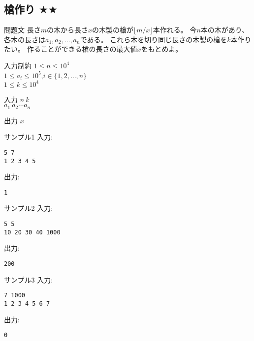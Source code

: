 \documentclass[a4paper,twoside,onecolumn,openany,article,10pt]{memoir}
\theoremstyle{remark}
\begin{document}
\clearpage
\subsection{槍作り $\bigstar\bigstar$}
\begin{itembox}[l]{問題文}
長さ$m$の木から長さ$x$の木製の槍が$\lfloor m/x\rfloor$本作れる。
今$n$本の木があり、各木の長さは$a_1,a_2,\dotsc,a_n$である。
これら木を切り同じ長さの木製の槍を$k$本作りたい。
作ることができる槍の長さの最大値$x$をもとめよ。
\end{itembox}

\begin{itembox}[l]{入力制約}
$1\le n\le 10^4$\\
$1\le a_i\le 10^5$,\hspace{2em}$i\in\{1,2,\dotsc,n\}$\\
$1\le k\le 10^4$
\end{itembox}

\begin{itembox}[l]{入力}
$n~k$\\
$a_1~a_2 \dotsb a_n$
\end{itembox}

\begin{itembox}[l]{出力}
$x$
\end{itembox}

\begin{itembox}[l]{サンプル1}
入力:
\begin{verbatim}
5 7
1 2 3 4 5
\end{verbatim}
出力:
\begin{verbatim}
1
\end{verbatim}
\end{itembox}

\begin{itembox}[l]{サンプル2}
入力:
\begin{verbatim}
5 5
10 20 30 40 1000
\end{verbatim}
出力:
\begin{verbatim}
200
\end{verbatim}
\end{itembox}

\begin{itembox}[l]{サンプル3}
入力:
\begin{verbatim}
7 1000
1 2 3 4 5 6 7
\end{verbatim}
出力:
\begin{verbatim}
0
\end{verbatim}
\end{itembox}
\end{document}
